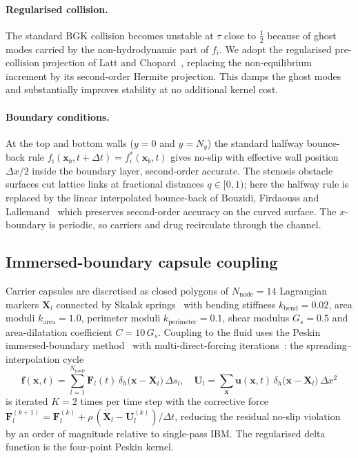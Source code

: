 \documentclass[11pt,a4paper]{article}
\begin{document}
\paragraph{Regularised collision.}
The standard BGK collision becomes unstable at $\tau$ close to
$\tfrac{1}{2}$ because of ghost modes carried by the
non-hydrodynamic part of $f_i$. We adopt the regularised
pre-collision projection of Latt and
Chopard~\citep{latt2006lattice}, replacing the non-equilibrium
increment by its second-order Hermite projection. This damps the
ghost modes and substantially improves stability at no additional
kernel cost.

\paragraph{Boundary conditions.}
At the top and bottom walls ($y=0$ and $y=N_y$) the standard
halfway bounce-back rule
$f_{\bar\imath}(\boldsymbol x_b, t+\Delta t) = f_i^{*}(\boldsymbol x_b, t)$
gives no-slip with effective wall position
$\Delta x/2$ inside the boundary layer, second-order accurate. The
stenosis obstacle surfaces cut lattice links at fractional
distances $q \in [0, 1)$; here the halfway rule is replaced by the
linear interpolated bounce-back of Bouzidi, Firdaouss and
Lallemand~\citep{bouzidi2001momentum} which preserves
second-order accuracy on the curved surface. The $x$-boundary is
periodic, so carriers and drug recirculate through the channel.

\subsection{Immersed-boundary capsule coupling}
\label{sec:methods-ibm}

Carrier capsules are discretised as closed polygons of
$N_{\text{node}} = 14$ Lagrangian markers $\boldsymbol X_l$
connected by Skalak springs~\citep{skalak1973strain} with bending
stiffness $k_{\text{bend}} = 0.02$, area moduli $k_{\text{area}} =
1.0$, perimeter moduli $k_{\text{perimeter}} = 0.1$, shear modulus
$G_s = 0.5$ and area-dilatation coefficient $C = 10\,G_s$. Coupling
to the fluid uses the Peskin immersed-boundary
method~\citep{peskin2002immersed} with multi-direct-forcing
iterations~\citep{luo2007full}: the
spreading--interpolation cycle
\begin{equation}
\boldsymbol f(\boldsymbol x, t) =
\sum_{l=1}^{N_{\text{node}}}
   \boldsymbol F_l(t)\,
   \delta_h\!\bigl(\boldsymbol x - \boldsymbol X_l\bigr)\,
   \Delta s_l,
\quad
\boldsymbol U_l =
\sum_{\boldsymbol x}
   \boldsymbol u(\boldsymbol x, t)\,
   \delta_h\!\bigl(\boldsymbol x - \boldsymbol X_l\bigr)\,
   \Delta x^2
\label{eq:ibm}
\end{equation}
is iterated $K = 2$ times per time step with the corrective force
$\boldsymbol F_l^{(k+1)} = \boldsymbol F_l^{(k)} +
\rho\,(\dot{\boldsymbol X}_l - \boldsymbol U_l^{(k)})/\Delta t$,
reducing the residual no-slip violation by an order of magnitude
relative to single-pass IBM. The regularised delta function is the
four-point Peskin kernel.
\end{document}
